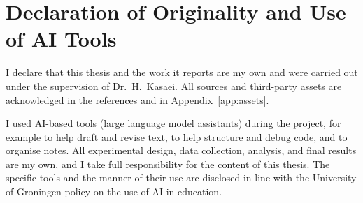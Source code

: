 \section{Declaration of Originality and Use of AI Tools}\label{app:declaration}
I declare that this thesis and the work it reports are my own and were carried out under the
supervision of Dr.\ H.\ Kasaei. All sources and third-party assets are acknowledged in the
references and in Appendix~\ref{app:assets}.

I used AI-based tools (large language model assistants) during the project, for example to
help draft and revise text, to help structure and debug code, and to organise notes. All
experimental design, data collection, analysis, and final results are my own, and I take full
responsibility for the content of this thesis. The specific tools and the manner of their use
are disclosed in line with the University of Groningen policy on the use of AI in education.
